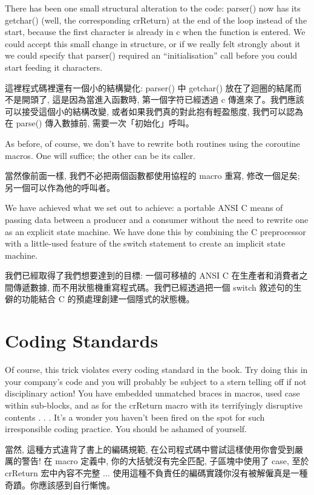 \documentclass[12pt]{article}
\begin{document}
\begin{CJK}{UTF8}{bsmi}
There has been one small structural alteration to the code: parser() now has its getchar() (well, the corresponding crReturn) at the end of the loop instead of the start, because the first character is already in c when the function is entered. We could accept this small change in structure, or if we really felt strongly about it we could specify that parser() required an ``initialisation'' call before you could start feeding it characters.

這裡程式碼裡還有一個小的結構變化: parser() 中 getchar() 放在了迴圈的結尾而不是開頭了, 這是因為當進入函數時, 第一個字符已經透過 c
傳進來了。我們應該可以接受這個小的結構改變, 或者如果我們真的對此抱有輕盈態度, 我們可以認為在 parse()
傳入數據前, 需要一次「初始化」呼叫。 

As before, of course, we don't have to rewrite both routines using the coroutine macros. One will suffice; the other can be its caller.

當然像前面一樣, 我們不必把兩個函數都使用協程的 macro 重寫, 修改一個足矣; 另一個可以作為他的呼叫者。

We have achieved what we set out to achieve: a portable ANSI C means of passing data between a producer and a consumer without the need to rewrite one as an explicit state machine. We have done this by combining the C preprocessor with a little-used feature of the switch statement to create an implicit state machine.


我們已經取得了我們想要達到的目標: 一個可移植的 ANSI C 在生產者和消費者之間傳遞數據, 而不用狀態機重寫程式碼。我們已經透過把一個
switch 敘述句的生僻的功能結合 C 的預處理創建一個隱式的狀態機。 

\section{Coding Standards}

Of course, this trick violates every coding standard in the book. Try doing this in your company's code and you will probably be subject to a stern telling off if not disciplinary action! You have embedded unmatched braces in macros, used case within sub-blocks, and as for the crReturn macro with its terrifyingly disruptive contents . . . It's a wonder you haven't been fired on the spot for such irresponsible coding practice. You should be ashamed of yourself.

當然, 這種方式違背了書上的編碼規範, 在公司程式碼中嘗試這樣使用你會受到嚴厲的警告! 在 macro 定義中, 你的大括號沒有完全匹配, 子區塊中使用了 case, 至於 crReturn 宏中內容不完整 ... 使用這種不負責任的編碼實踐你沒有被解僱真是一種奇蹟。你應該感到自行慚愧。 


\end{CJK}
\end{document}
